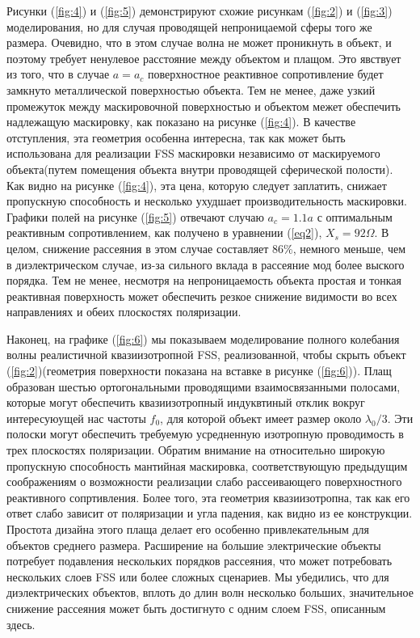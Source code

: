 \documentclass[12pt,a4paper]{article}
\begin{document}
Рисунки (\ref{fig:4}) и (\ref{fig:5}) демонстрируют схожие рисункам 
(\ref{fig:2}) и (\ref{fig:3})
моделирования, но для случая проводящей непроницаемой сферы того же размера. Очевидно, что
в этом случае волна не может проникнуть в объект, и поэтому требует ненулевое расстояние
между объектом и плащом. Это явствует из того, что в случае $a=a_c$ поверхностное реактивное
сопротивление будет замкнуто металлической поверхностью объекта. Тем не менее, даже узкий
промежуток между маскировочной поверхностью и объектом межет обеспечить надлежащую 
маскировку, как показано на рисунке (\ref{fig:4}). В качестве отступления, эта геометрия 
особенна интересна, так как может быть использована для реализации FSS маскировки
независимо от маскируемого объекта(путем помещения объекта внутри проводящей сферической 
полости). Как видно на рисунке (\ref{fig:4}), эта цена, которую следует заплатить, снижает
пропускную способность и несколько ухудшает производительность маскировки. Графики полей
на рисунке (\ref{fig:5}) отвечают случаю $a_c=1.1a$ с оптимальным реактивным сопротивлением,
как получено в уравнении (\ref{eq2}), $X_s=92\Omega$. В целом, снижение рассеяния в этом
случае составляет 86\%, немного меньше, чем в диэлектрическом случае, из-за сильного
вклада в рассеяние мод более выского порядка. Тем не менее, несмотря на непроницаемость 
объекта простая и тонкая реактивная поверхность может обеспечить резкое снижение видимости
во всех направлениях и обеих плоскостях поляризации.

Наконец, на графике (\ref{fig:6}) мы показываем моделирование полного колебания волны 
реалистичной квазиизотропной FSS, реализованной, чтобы скрыть объект (\ref{fig:2})(геометрия
поверхности показана на вставке в рисунке (\ref{fig:6})). Плащ образован шестью 
ортогональными
проводящими взаимосвязанными полосами, которые могут обеспечить квазиизотропный индуквтиный
отклик вокруг интересуюущей нас частоты $f_0$, для которой объект имеет размер около
$\lambda_0/3$. Эти полоски могут обеспечить требуемую усредненную изотропную проводимость
в трех плоскостях поляризации. Обратим внимание на относительно широкую пропускную 
способность мантийная маскировка, соответствующую предыдущим соображениям о возможности реализации
слабо рассеивающего поверхностного реактивного сопртивления. Более того, эта геометрия
квазиизотропна, так как его ответ слабо зависит от поляризации и угла падения, как видно
из ее конструкции. Простота дизайна этого плаща делает его особенно привлекательным для
объектов среднего размера. Расширение на большие электрические объекты потребует подавления
нескольких порядков рассеяния, что может потребовать нескольких слоев FSS или более сложных
сценариев. Мы убедились, что для диэлектрических объектов, вплоть до длин волн несколько
больших, значительное снижение рассеяния может быть достигнуто с одним слоем FSS, описанным
здесь.
\end{document}
